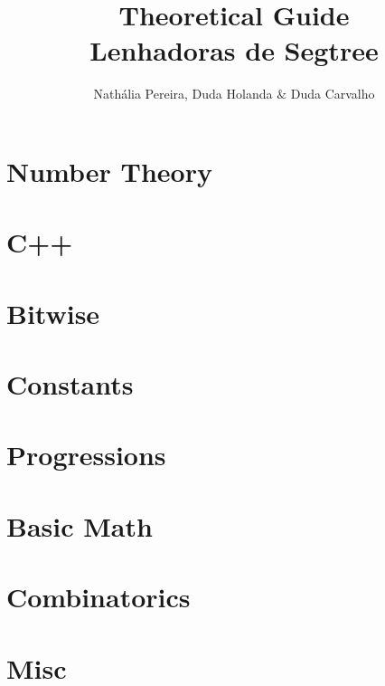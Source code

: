 \documentclass[10pt, twocolumn]{article}
\title{\vspace{-2cm}\textbf{Theoretical Guide\\Lenhadoras de Segtree}}
\author{Nathália Pereira, Duda Holanda $\&$ Duda Carvalho}
\date{}
\begin{document}
\maketitle
\tableofcontents\section{Number Theory}











\section{C++}


\section{Bitwise}




\section{Constants}

\section{Progressions}


\section{Basic Math}



\section{Combinatorics}

\section{Misc}


\end{document}
